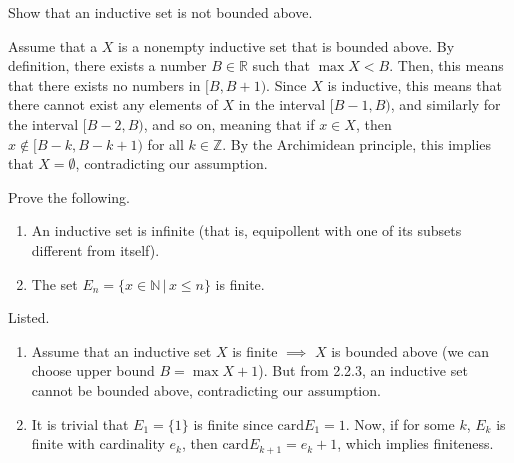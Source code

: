   \begin{exercise}[Zorich 2.2.3]
    Show that an inductive set is not bounded above. 
  \end{exercise}
  \begin{solution}
    Assume that a $X$ is a nonempty inductive set that is bounded above. By definition, there exists a number $B \in \mathbb{R}$ such that $\max{X} < B$. Then, this means that there exists no numbers in $[B, B + 1)$. Since $X$ is inductive, this means that there cannot exist any elements of $X$ in the interval $[B-1, B)$, and similarly for the interval $[B-2, B)$, and so on, meaning that if $x \in X$, then $x \not\in [B-k, B-k + 1)$ for all $k\in \mathbb{Z}$. By the Archimidean principle, this implies that $X = \emptyset$, contradicting our assumption. 
  \end{solution}

  \begin{exercise}[Zorich 2.2.4]
    Prove the following. 
    \begin{enumerate}
      \item An inductive set is infinite (that is, equipollent with one of its subsets different from itself). 
      \item The set $E_n = \{x \in \mathbb{N}\,|\, x \leq n\}$ is finite. 
    \end{enumerate}
  \end{exercise}
  \begin{solution}
    Listed. 
    \begin{enumerate}
      \item Assume that an inductive set $X$ is finite $\implies$ $X$ is bounded above (we can choose upper bound $B = \max{X} + 1$). But from 2.2.3, an inductive set cannot be bounded above, contradicting our assumption. 
      \item It is trivial that $E_1 = \{1\}$ is finite since $\text{card}{E_1} = 1$. Now, if for some $k$, $E_k$ is finite with cardinality $e_k$, then $\text{card}{E_{k+1}} = e_k + 1$, which implies finiteness.  
    \end{enumerate}
  \end{solution}

